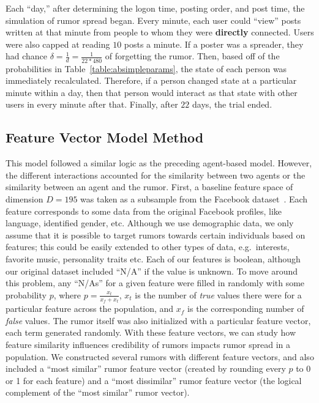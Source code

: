 Each ``day,'' after determining the logon time, posting order, and post time, the simulation of rumor spread began.
Every minute, each user could ``view'' posts written at that minute from people to whom they were \textbf{directly} connected.
Users were also capped at reading $ 10 $ posts a minute.
If a poster was a spreader, they had chance $ \delta = \frac{1}{d} = \frac{1}{22*480} $ of forgetting the rumor.
Then, based off of the probabilities in Table~\ref{table:absimpleparams}, the state of each person was immediately recalculated.
Therefore, if a person changed state at a particular minute within a day, then that person would interact as that state with other users in every minute after that.
Finally, after $ 22 $ days, the trial ended.

\subsection{Feature Vector Model Method}
\label{subsec:fvmodelsetup}

This model followed a similar logic as the preceding agent-based model.
However, the different interactions accounted for the similarity between two agents or the similarity between an agent and the rumor.
First, a baseline feature space of dimension $ D = 195 $ was taken as a subsample from the Facebook dataset~\cite{mcauley-2014}.
Each feature corresponds to some data from the original Facebook profiles, like language, identified gender, etc.
Although we use demographic data, we only assume that it is possible to target rumors towards certain individuals based on features; this could be easily extended to other types of data, e.g.\ interests, favorite music, personality traits etc.
Each of our features is boolean, although our original dataset included ``N/A'' if the value is unknown.
To move around this problem, any ``N/As'' for a given feature were filled in randomly with some probability $ p $, where $ p = \frac{x_{t}}{x_{f} + x_{t}} $, $ x_{t} $ is the number of \textit{true} values there were for a particular feature across the population, and $ x_{f} $ is the corresponding number of \textit{false} values.
The rumor itself was also initialized with a particular feature vector, each term generated randomly.
With these feature vectors, we can study how feature similarity influences credibility of rumors impacts rumor spread in a population.
We constructed several rumors with different feature vectors, and also included a ``most similar'' rumor feature vector (created by rounding every $ p $ to 0 or 1 for each feature) and a ``most dissimilar'' rumor feature vector (the logical complement of the ``most similar'' rumor vector).

